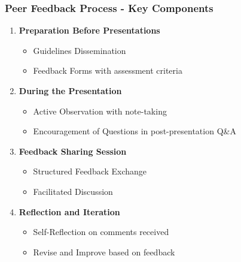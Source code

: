 \documentclass[aspectratio=169]{beamer}
\begin{document}
\begin{frame}[fragile]
    \frametitle{Peer Feedback Process - Key Components}
    \begin{enumerate}
        \item \textbf{Preparation Before Presentations}
            \begin{itemize}
                \item Guidelines Dissemination
                \item Feedback Forms with assessment criteria
            \end{itemize}
        
        \item \textbf{During the Presentation}
            \begin{itemize}
                \item Active Observation with note-taking
                \item Encouragement of Questions in post-presentation Q\&A
            \end{itemize}
        
        \item \textbf{Feedback Sharing Session}
            \begin{itemize}
                \item Structured Feedback Exchange
                \item Facilitated Discussion
            \end{itemize}
        
        \item \textbf{Reflection and Iteration}
            \begin{itemize}
                \item Self-Reflection on comments received
                \item Revise and Improve based on feedback
            \end{itemize}
    \end{enumerate}
\end{frame}
\end{document}
